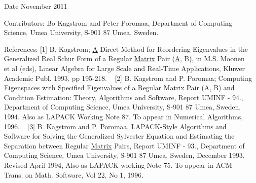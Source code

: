 \begin{DoxyDate}{Date}
November 2011 
\end{DoxyDate}
\begin{DoxyParagraph}{Contributors\+: }
Bo Kagstrom and Peter Poromaa, Department of Computing Science, Umea University, S-\/901 87 Umea, Sweden. 
\end{DoxyParagraph}
\begin{DoxyParagraph}{References\+: }
\mbox{[}1\mbox{]} B. Kagstrom; \hyperlink{classA}{A} Direct Method for Reordering Eigenvalues in the Generalized Real Schur Form of a Regular \hyperlink{classMatrix}{Matrix} Pair (\hyperlink{classA}{A}, B), in M.\+S. Moonen et al (eds), Linear Algebra for Large Scale and Real-\/\+Time Applications, Kluwer Academic Publ. 1993, pp 195-\/218. ~\newline
 \mbox{[}2\mbox{]} B. Kagstrom and P. Poromaa; Computing Eigenspaces with Specified Eigenvalues of a Regular \hyperlink{classMatrix}{Matrix} Pair (\hyperlink{classA}{A}, B) and Condition Estimation\+: Theory, Algorithms and Software, Report U\+M\+I\+N\+F -\/ 94., Department of Computing Science, Umea University, S-\/901 87 Umea, Sweden, 1994. Also as L\+A\+P\+A\+C\+K Working Note 87. To appear in Numerical Algorithms, 1996. ~\newline
 \mbox{[}3\mbox{]} B. Kagstrom and P. Poromaa, L\+A\+P\+A\+C\+K-\/\+Style Algorithms and Software for Solving the Generalized Sylvester Equation and Estimating the Separation between Regular \hyperlink{classMatrix}{Matrix} Pairs, Report U\+M\+I\+N\+F -\/ 93., Department of Computing Science, Umea University, S-\/901 87 Umea, Sweden, December 1993, Revised April 1994, Also as L\+A\+P\+A\+C\+K working Note 75. To appear in A\+C\+M Trans. on Math. Software, Vol 22, No 1, 1996. 
\end{DoxyParagraph}

